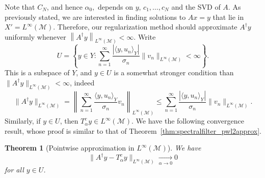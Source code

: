 \documentclass{article}
\newtheorem{theorem}{Theorem}[section]
\theoremstyle{definition}
\newcommand{\smallnorm}[1]{\lVert#1\rVert}
\newcommand{\norm}[1]{\left\lVert#1\right\rVert}
\newcommand{\abs}[1]{\left\lvert#1\right\rvert}
\newcommand{\pseudoinv}[1]{{#1}^\dagger}
\begin{document}
Note that $C_N$, and hence $\alpha_0,$ depends on $y$, $c_1,\dots,c_N$ and the SVD of $A$. As previously stated, we are interested in finding solutions to \(Ax=y\) that lie in \(X'=L^\infty(\mathcal{M})\).
Therefore, our regularization method should approximate \(\pseudoinv{A}y\) uniformly whenever \(\norm{\pseudoinv{A}y}_{L^\infty(\mathcal{M})}<\infty\).
Write
\begin{equation}
\label{eq:uniformsourceset}
    U
    =
    \left\{
    y\in Y\colon 
    \sum_{n=1}^\infty \frac{\abs{\langle y,u_n\rangle_Y}}{\sigma_n}\smallnorm{v_n}_{L^\infty(\mathcal{M})} < \infty
    \right\}.
\end{equation}
This is a subspace of \(Y\), and
\(y\in U\) is
a somewhat stronger condition than \(\smallnorm{\pseudoinv{A}y}_{L^\infty(\mathcal{M})}<\infty\), indeed
\[
\smallnorm{\pseudoinv{A}y}_{L^\infty(\mathcal{M})} =\norm{
    \sum_{n=1}^\infty  \frac{\langle y, u_n\rangle_Y}{\sigma_n}    v_n
    }_{L^\infty(\mathcal{M})}\le \sum_{n=1}^\infty \frac{\abs{\langle y,u_n\rangle_Y}}{\sigma_n}\smallnorm{v_n}_{L^\infty(\mathcal{M})}.
\]
Similarly, if $y\in U$, then $T^c_\alpha y\in L^\infty(\mathcal{M})$.
We have the following convergence result, whose proof is similar to that of Theorem~\ref{thm:spectralfilter_pwl2approx}.

\begin{theorem}[Pointwise approximation in \(L^\infty(\mathcal{M})\)]
\label{thm:spectralfilter_pwuniformapprox}
    We have
    \begin{equation*}
        \smallnorm{\pseudoinv{A} y - T^c_\alpha y}_{L^\infty(\mathcal{M})}
        \xrightarrow[\alpha\to 0]{}0
    \end{equation*}
    for all \(y\in U\).
\end{theorem}
\end{document}
